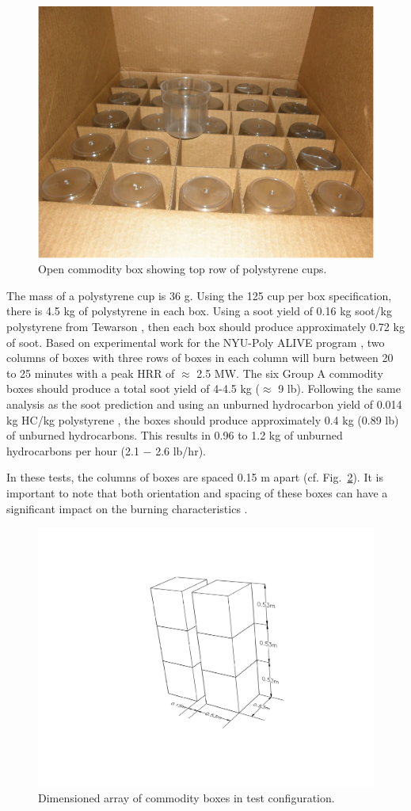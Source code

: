 \documentclass[12pt,oneside]{book}
\begin{document}
\begin{figure}
\centering
\includegraphics[width=.7\textwidth]{../Figures/open_box}
\caption {Open commodity box showing top row of polystyrene cups.}
\label{fig:open_box}
\end{figure}

The mass of a polystyrene cup is 36 g. Using the 125 cup per box specification, there is 4.5 kg of polystyrene in each box. Using a soot yield of 0.16 kg soot/kg polystyrene from Tewarson \cite{SFPE:Tewarson}, then each box should produce approximately 0.72 kg of soot. Based on experimental work for the NYU-Poly ALIVE program \cite{Madrzykowski2013}, two columns of boxes with three rows of boxes in each column will burn between 20 to 25 minutes with a peak HRR of $\approx$ 2.5 MW. The six Group A commodity boxes should produce a total soot yield of 4-4.5 kg ($\approx$ 9 lb). Following the same analysis as the soot prediction and using an unburned hydrocarbon yield of 0.014 kg HC/kg polystyrene \cite{SFPE:Tewarson}, the boxes should produce approximately 0.4 kg (0.89 lb) of unburned hydrocarbons. This results in 0.96 to 1.2 kg of unburned hydrocarbons per hour (2.1 $-$ 2.6 lb/hr).

In these tests, the columns of boxes are spaced 0.15 m apart (cf. Fig.~\ref{fig:dim_box}). It is important to note that both orientation and spacing of these boxes can have a significant impact on the burning characteristics \cite{Madrzykowski2013}.

\begin{figure}
\centering
\includegraphics[width=.7\textwidth]{../Figures/dim_box_array}
\caption {Dimensioned array of commodity boxes in test configuration.}
\label{fig:dim_box}
\end{figure}
\end{document}
